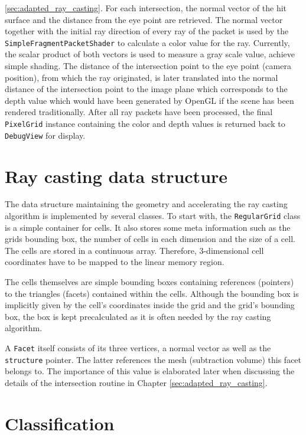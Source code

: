 \ref{sec:adapted_ray_casting}. For each intersection, the normal vector of the hit surface and the distance from the eye point are retrieved. The normal vector together with the initial ray direction of every ray of the packet is used by the \lstinline!SimpleFragmentPacketShader! to calculate a color value for the ray. Currently, the scalar product of both vectors is used to measure a gray scale value, achieve simple shading. The distance of the intersection point to the eye point (camera position), from which the ray originated, is later translated into the normal distance of the intersection point to the image plane which corresponds to the depth value which would have been generated by OpenGL if the scene has been rendered traditionally. After all ray packets have been processed, the final \lstinline!PixelGrid! instance containing the color and depth values is returned back to \lstinline!DebugView! for display.

\section{Ray casting data structure}
\label{sec:data_structure}

The data structure maintaining the geometry and accelerating the ray casting algorithm is implemented by several classes. To start with, the \lstinline!RegularGrid! class is a simple container for cells. It also stores some meta information such as the grids bounding box, the number of cells in each dimension and the size of a cell. The cells are stored in a continuous array. Therefore, 3-dimensional cell coordinates have to be mapped to the linear memory region.

\pagebreak

The cells themselves are simple bounding boxes containing references (pointers) to the triangles (facets) contained within the cells. Although the bounding box is implicitly given by the cell's coordinates inside the grid and the grid's bounding box, the box is kept precalculated as it is often needed by the ray casting algorithm. 

A \lstinline!Facet! itself consists of its three vertices, a normal vector as well as the \lstinline!structure! pointer. The latter references the mesh (subtraction volume) this facet belongs to. The importance of this value is elaborated later when discussing the details of the intersection routine in Chapter \ref{sec:adapted_ray_casting}.

\section{Classification}
\label{sec:classification}

